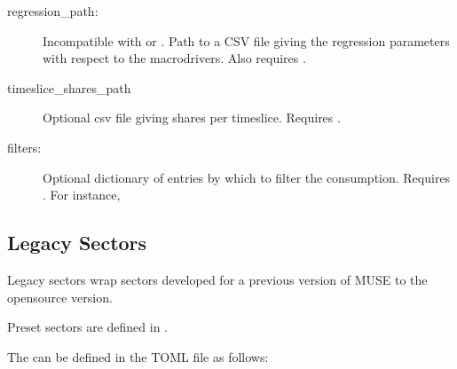 \documentclass[letterpaper,10pt,english]{sphinxmanual}
\begin{document}
\label{\detokenize{inputs/toml:preset-regression}}\begin{description}
\item[{regression\_path:}] \leavevmode
Incompatible with {\hyperref[\detokenize{inputs/toml:preset-consumption}]{}} or
{\hyperref[\detokenize{inputs/toml:preset-demand}]{}}. Path to a CSV file giving the regression
parameters with respect to the macrodrivers.
Also requires {\hyperref[\detokenize{inputs/toml:preset-macro}]{}}.

\item[{timeslice\_shares\_path}] \leavevmode
Optional csv file giving shares per timeslice. Requires
{\hyperref[\detokenize{inputs/toml:preset-consumption}]{}}.

\item[{filters:}] \leavevmode
Optional dictionary of entries by which to filter the consumption.  Requires
{\hyperref[\detokenize{inputs/toml:preset-consumption}]{}}. For instance,

\begin{sphinxVerbatim}[commandchars=\\\{\}]
  \PYG{p}{[} \PYG{p}{]}
  \PYG{p}{[} \PYG{p}{]}
\end{sphinxVerbatim}

\end{description}


\subsection{Legacy Sectors}
\label{\detokenize{inputs/toml:legacy-sectors}}
Legacy sectors wrap sectors developed for a previous version of MUSE to the open\sphinxhyphen{}source
version.

Preset sectors are defined in .

The can be defined in the TOML file as follows:
\end{document}
